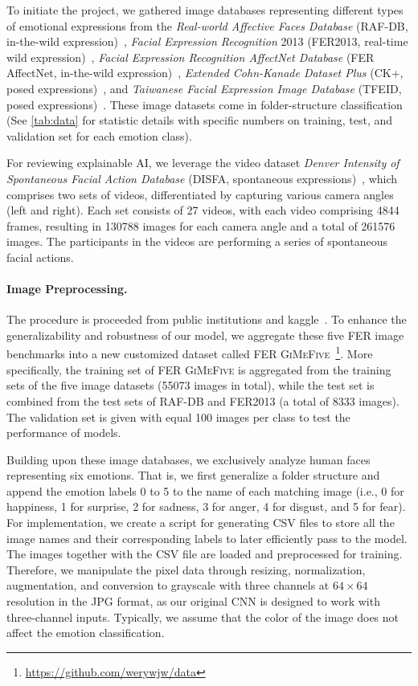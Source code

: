 To initiate the project, 
we gathered image databases representing different types of emotional expressions from the
\textit{Real-world Affective Faces Database} (RAF-DB, in-the-wild expression)~\cite{li_reliable_2017,li2019reliable}, 
\textit{Facial Expression Recognition} 2013 (FER2013, real-time wild expression)~\cite{BarsoumZCZ16}, 
\textit{Facial Expression Recognition AffectNet Database} (FER AffectNet, in-the-wild expression)~\cite{Mollah2019ANet}, 
\textit{Extended Cohn-Kanade Dataset Plus} (CK+, posed expressions)~\cite{LuceyCKSAM10}, 
and \textit{Taiwanese Facial Expression Image Database} (TFEID, posed expressions)~\cite{tfeid,LiGL22}.
These image datasets come in folder-structure classification (See \cref{tab:data} 
for statistic details with specific numbers on training, test, and validation set for each emotion class). 

For reviewing explainable AI, 
we leverage the video dataset \textit{Denver Intensity of Spontaneous Facial Action Database} 
(DISFA, spontaneous expressions)~\cite{MavadatiMBTC13}, 
which comprises two sets of videos, 
differentiated by capturing various camera angles (left and right). 
Each set consists of 27 videos, with each video comprising 4844 frames, 
resulting in 130788 images for each camera angle and a total of 261576 images. 
The participants in the videos are performing a series of spontaneous facial actions. 

\paragraph{Image Preprocessing.}
The procedure is proceeded from public institutions and kaggle~\cite{kaggle_rafdb,kagaff}. 
To enhance the generalizability and robustness of our model, 
we aggregate these five FER image benchmarks into a new customized dataset called FER 
\textsc{GiMeFive}~\footnote{\url{https://github.com/werywjw/data}}. 
More specifically, 
the training set of FER \textsc{GiMeFive} is aggregated from the training sets of the five image datasets (55073 images in total), 
while the test set is combined from the test sets of RAF-DB and FER2013 (a total of 8333 images). 
The validation set is given with equal 100 images per class to test the performance of models. 

Building upon these image databases, we exclusively analyze human faces representing six emotions. 
That is, we first generalize a folder structure and append the emotion labels 0 to 5 to the name of each matching image 
(i.e., 0 for happiness, 1 for surprise, 2 for sadness, 3 for anger, 4 for disgust, and 5 for fear).
For implementation, 
we create a script for generating CSV files to store all the image names and their corresponding labels to later efficiently pass to the model. 
The images together with the CSV file are loaded and preprocessed for training. 
Therefore, we manipulate the pixel data through resizing, normalization, 
augmentation, and conversion to grayscale with three channels at $64 \times 64$ resolution in the JPG format, 
as our original CNN is designed to work with three-channel inputs. 
Typically, we assume that the color of the image does not affect the emotion classification. 

